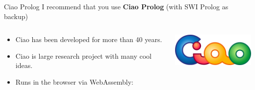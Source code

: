 \begin{frame}{Ciao Prolog}
I recommend that you use \textbf{Ciao Prolog} (with SWI Prolog as backup)
\begin{columns}
\begin{column}{.7\textwidth}
\begin{itemize}
    \item Ciao has been developed for more than 40 years.
    \item Ciao is large research project with many cool ideas. 
    \item Runs in the browser via WebAssembly: 
\end{itemize}
\end{column}
\begin{column}{.3\textwidth}
    \centering
    \includegraphics[width=0.8\columnwidth]{img/ciao-logo.png}
\end{column}
\end{columns}
\end{frame}

\begin{frame}
\end{frame}

